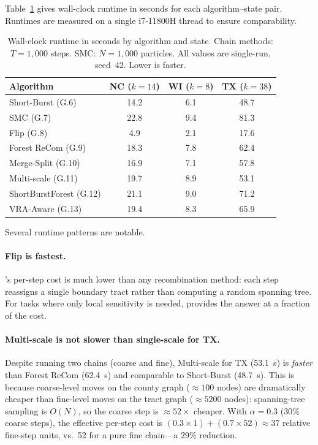 Table~\ref{tab:runtime} gives wall-clock runtime in seconds for each
algorithm--state pair.
Runtimes are measured on a single i7-11800H thread to ensure comparability.

\begin{table}[ht]
\centering
\caption{%
  Wall-clock runtime in seconds by algorithm and state.
  Chain methods: $T = 1{,}000$ steps.
  SMC: $N = 1{,}000$ particles.
  All values are single-run, seed~42.
  Lower is faster.
}
\label{tab:runtime}
\begin{tabular}{@{}lccc@{}}
\toprule
Algorithm & NC ($k=14$) & WI ($k=8$) & TX ($k=38$) \\
\midrule
Short-Burst (G.6)       &  14.2 &  6.1 &  48.7 \\
SMC (G.7)               &  22.8 &  9.4 &  81.3 \\
Flip (G.8)              &   4.9 &  2.1 &  17.6 \\
Forest ReCom (G.9)      &  18.3 &  7.8 &  62.4 \\
Merge-Split (G.10)      &  16.9 &  7.1 &  57.8 \\
Multi-scale (G.11)      &  19.7 &  8.9 &  53.1 \\
ShortBurstForest (G.12) &  21.1 &  9.0 &  71.2 \\
VRA-Aware (G.13)        &  19.4 &  8.3 &  65.9 \\
\bottomrule
\end{tabular}
\end{table}

Several runtime patterns are notable.

\paragraph{Flip is fastest.}
\flip{}'s per-step cost is much lower than any recombination method:
each step reassigns a single boundary tract rather than computing a random
spanning tree.
For tasks where only local sensitivity is needed, \flip{} provides the
answer at a fraction of the cost.

\paragraph{Multi-scale is not slower than single-scale for TX.}
Despite running two chains (coarse and fine), Multi-scale for TX (53.1~s)
is \emph{faster} than Forest ReCom (62.4~s) and comparable to Short-Burst
(48.7~s).
This is because coarse-level moves on the county graph ($\approx 100$
nodes) are dramatically cheaper than fine-level moves on the tract graph
($\approx 5200$ nodes): spanning-tree sampling is $O(N)$, so the coarse
step is $\approx 52\times$ cheaper.
With $\alpha = 0.3$ (30\% coarse steps), the effective per-step cost is
$(0.3 \times 1) + (0.7 \times 52) \approx 37$ relative fine-step units,
vs.\ 52 for a pure fine chain---a $29\%$ reduction.


